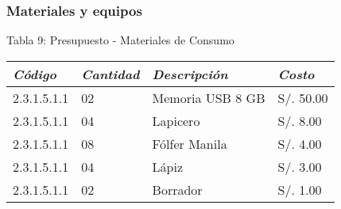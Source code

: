     \subsubsection{Materiales y equipos}
            \begin{table}[h!]
                \centering
                { Tabla 9: Presupuesto - Materiales de Consumo}\par
                \begin{tabular}{|p{2.2cm}|p{1.8cm}|p{3.8cm}|p{2.2cm}|} \hline
                    
                
                \textit{{\bf{Código}}} &
                \textit{{\bf{Cantidad}}} &
                \textit{{\bf{Descripción}}} &
                \textit{{\bf{Costo}}}
                \\ \hline

                2.3.1.5.1.1 &
                02 &
                Memoria USB 8 GB &
                S/. 50.00
                \\ \hline

                2.3.1.5.1.1 &
                04 &
                Lapicero &
                S/. 8.00
                \\ \hline

                2.3.1.5.1.1 &
                08 &
                Fólfer Manila &
                S/. 4.00
                \\ \hline

                2.3.1.5.1.1 &
                04 &
                Lápiz &
                S/. 3.00
                \\ \hline

                2.3.1.5.1.1 &
                02 &
                Borrador &
                S/. 1.00
                \\ \hline


\end{tabular}
\end{table}
